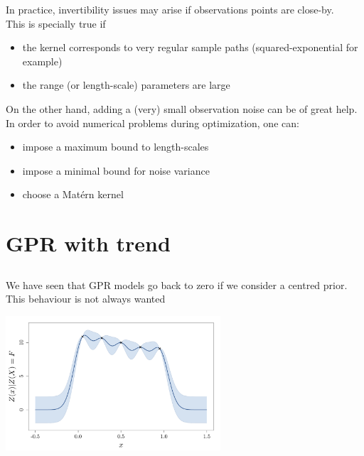 \documentclass{beamer}
\begin{document}
\begin{frame}{}
In practice, invertibility issues may arise if observations points are close-by. \\
\vspace{3mm}
This is specially true if
\begin{itemize}
	\item the kernel corresponds to very regular sample paths (squared-exponential for example)
	\item the range (or length-scale) parameters are large
\end{itemize}
On the other hand, adding a (very) small observation noise can be of great help.\\
\vspace{3mm}
In order to avoid numerical problems during optimization, one can:
\begin{itemize}
	\item impose a maximum bound to length-scales
	\item impose a minimal bound for noise variance 
	\item choose a Mat\'ern kernel
\end{itemize}
\end{frame}

\section{GPR with trend}
\subsection{}


\begin{frame}{}
We have seen that GPR models go back to zero if we consider a centred prior. \\ \vspace{5mm} This behaviour is not always wanted
\begin{center}
	\includegraphics[height=5cm]{figures/R/trend_pb}
\end{center}
\end{frame}
\end{document}
